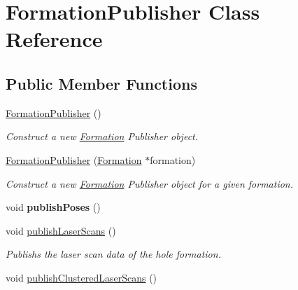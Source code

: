 \hypertarget{classFormationPublisher}{}\section{Formation\+Publisher Class Reference}
\label{classFormationPublisher}
\subsection*{Public Member Functions}
\begin{DoxyCompactItemize}
\item 
\hyperlink{classFormationPublisher_a5ce149496bdaebcaac0989a0db61530a}{Formation\+Publisher} ()\hypertarget{classFormationPublisher_a5ce149496bdaebcaac0989a0db61530a}{}\label{classFormationPublisher_a5ce149496bdaebcaac0989a0db61530a}

\begin{DoxyCompactList}\small\item\em Construct a new \hyperlink{classFormation}{Formation} Publisher object. \end{DoxyCompactList}\item 
\hyperlink{classFormationPublisher_abad14f3b8d260c25ff13389b6b598c83}{Formation\+Publisher} (\hyperlink{classFormation}{Formation} $\ast$formation)
\begin{DoxyCompactList}\small\item\em Construct a new \hyperlink{classFormation}{Formation} Publisher object for a given formation. \end{DoxyCompactList}\item 
void {\bfseries publish\+Poses} ()\hypertarget{classFormationPublisher_a10fc32146697d23385516d9419951b62}{}\label{classFormationPublisher_a10fc32146697d23385516d9419951b62}

\item 
void \hyperlink{classFormationPublisher_a07b3b18afbd63e7def97631ad594bd93}{publish\+Laser\+Scans} ()\hypertarget{classFormationPublisher_a07b3b18afbd63e7def97631ad594bd93}{}\label{classFormationPublisher_a07b3b18afbd63e7def97631ad594bd93}

\begin{DoxyCompactList}\small\item\em Publishs the laser scan data of the hole formation. \end{DoxyCompactList}\item 
void \hyperlink{classFormationPublisher_a6062b9c79aa0a9503a7b58615db027dc}{publish\+Clustered\+Laser\+Scans} ()\hypertarget{classFormationPublisher_a6062b9c79aa0a9503a7b58615db027dc}{}\label{classFormationPublisher_a6062b9c79aa0a9503a7b58615db027dc}


\end{DoxyCompactItemize}
